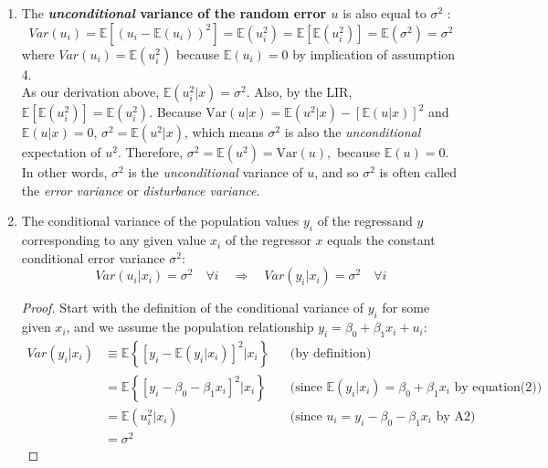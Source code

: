 \documentclass[a4paper, 10pt]{article}
\theoremstyle{definition}	%
\begin{document}
\begin{enumerate}
    \item The \textbf{\textit{unconditional} variance of the random error $u$} is also equal to $\sigma ^2$ :
    \begin{equation*}
        Var(u_i) = \mathbb{E}[(u_i-\mathbb{E}(u_i))^2] = \mathbb{E}(u_i^2) = \mathbb{E}[\mathbb{E}(u_i^2)] = \mathbb{E}(\sigma^2) = \sigma^2
    \end{equation*}
    where $Var(u_i) = \mathbb{E}(u_i^2)$ because $\mathbb{E}(u_i) = 0$ by implication of assumption 4.\\
    As our derivation above, $\mathbb{E}(u_i^2|x) = \sigma^2$. Also, by the LIR, $\mathbb{E}[\mathbb{E}(u_i^2)] = \mathbb{E}(u_i^2)$. 
    Because $\text{Var}(u|x) = \mathbb{E}(u^2|x) - [\mathbb{E}(u|x)]^2$ and $ \mathbb{E}(u|x) = 0$, $\sigma^2 = \mathbb{E}(u^2|x)$, which means $\sigma^2$ is also the \textit{unconditional} expectation of $ u^2 $. Therefore, 
    $\sigma^2 = \mathbb{E}(u^2) = \text{Var}(u),$ because $\mathbb{E}(u) = 0$. In other words, \( \sigma^2 \) is the \textit{unconditional} variance of \( u \), and so \( \sigma^2 \) is often called the \textit{error variance} or \textit{disturbance variance}.
    \item  The conditional variance of the population values $y_i$ of the regressand $y$ corresponding to any given value $x_i$ of the regressor $x$ equals the constant conditional error variance $\sigma^2$:
    \begin{equation*}
        Var(u_i|x_i) = \sigma^2 \quad \forall i \quad \Rightarrow \quad Var(y_i|x_i) = \sigma^2 \quad \forall i
    \end{equation*}
    \begin{proof}
        Start with the definition of the conditional variance of $y_i$ for some given $x_i$, and we assume the population relationship $ y_i = \beta_0 + \beta_1 x_i + u_i$:
        \begin{align*}
        Var(y_i | x_i) &\equiv \mathbb{E} \left\{ \left[ y_i - \mathbb{E}(y_i|x_i) \right]^2 | x_i \right\} 
        && \text{(by definition)} \\
        &= \mathbb{E} \left\{ \left[ y_i - \beta_0 - \beta_1 x_i \right]^2 | x_i \right\}
        && \text{(since } \mathbb{E}(y_i | x_i) = \beta_0 + \beta_1 x_i \text{ by equation(2))} \\
        &= \mathbb{E} \left( u_i^2 | x_i \right) 
        && \text{(since } u_i = y_i - \beta_0 - \beta_1 x_i \text{ by A2)} \\
        &= \sigma^2 

\end{align*}
\end{proof}
\end{enumerate}
\end{document}
